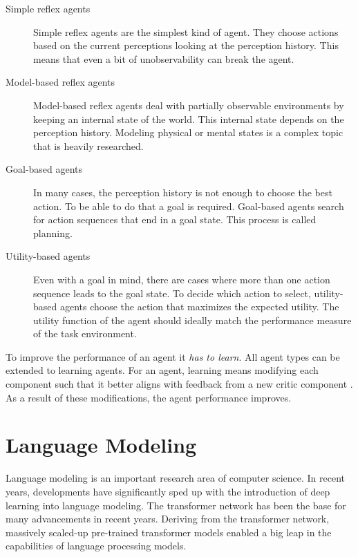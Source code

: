 \documentclass[../main.tex]{subfiles}
\begin{document}
\begin{description}
    \item[Simple reflex agents]
          Simple reflex agents are the simplest kind of agent.
          They choose actions based on the current perceptions looking at the perception history.
          This means that even a bit of unobservability can break the agent.
    \item[Model-based reflex agents]
          Model-based reflex agents deal with partially observable environments
          by keeping an internal state of the world.
          This internal state depends on the perception history.
          Modeling physical or mental states is a complex topic that is heavily researched.
    \item[Goal-based agents]
          In many cases, the perception history is not enough to choose the best action.
          To be able to do that a goal is required.
          Goal-based agents search for action sequences that end in a goal state.
          This process is called planning.
    \item[Utility-based agents]
          Even with a goal in mind, there are cases where more than one action sequence leads to the goal state.
          To decide which action to select, utility-based agents choose the action that maximizes the expected utility.
          The utility function of the agent should ideally match the performance measure of the task environment.
\end{description}

To improve the performance of an agent it \emph{has to learn}.
All agent types can be extended to learning agents.
For an agent, learning means modifying each component
such that it better aligns with feedback from a new critic component \autocite{Russel2022}.
As a result of these modifications, the agent performance improves.

\section{Language Modeling}
\label{sec:language_modeling}
Language modeling is an important research area of computer science.
In recent years, developments have significantly sped up with the introduction of deep learning into language modeling.
The transformer network \cite{Vaswani2017} has been the base for many advancements in recent years.
Deriving from the transformer network,
massively scaled-up pre-trained transformer models \autocite{Brown2020}
enabled a big leap in the capabilities of language processing models.
\end{document}
